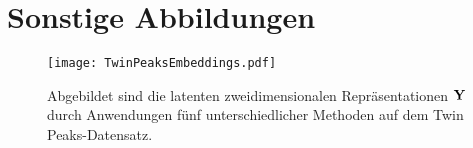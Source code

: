\section{Sonstige Abbildungen}

\begin{figure}
	\centering
	\texttt{[image: TwinPeaksEmbeddings.pdf]}
	\caption[Latente zweidimensionale Repräsentationen $\mat{Y}$ durch Anwendungen fünf unterschiedlicher Methoden auf dem Twin Peaks-Datensatz.]{Abgebildet sind die latenten zweidimensionalen Repräsentationen $\mat{Y}$ durch Anwendungen fünf unterschiedlicher Methoden auf dem Twin Peaks-Datensatz.}
\end{figure}